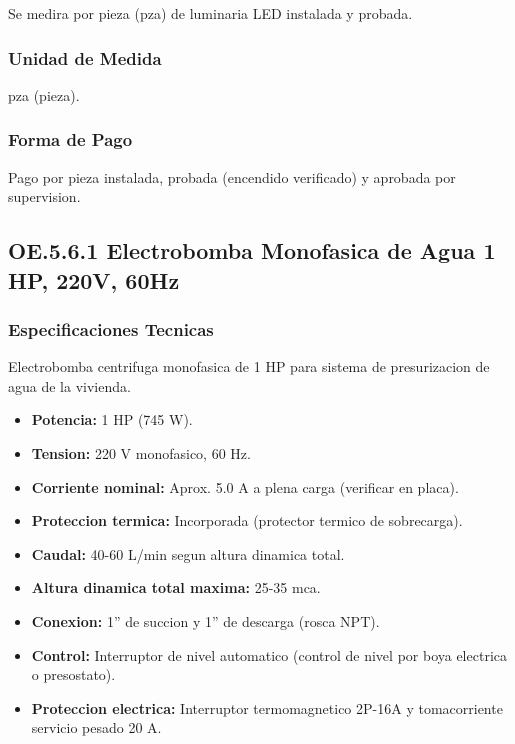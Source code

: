 Se medira por pieza (pza) de luminaria LED instalada y probada.

\subsubsection{Unidad de Medida}

pza (pieza).

\subsubsection{Forma de Pago}

Pago por pieza instalada, probada (encendido verificado) y aprobada por supervision.

\subsection{OE.5.6.1 Electrobomba Monofasica de Agua 1 HP, 220V, 60Hz}

\subsubsection{Especificaciones Tecnicas}

Electrobomba centrifuga monofasica de 1 HP para sistema de presurizacion de agua de la vivienda.

\begin{itemize}[nosep]
  \item \textbf{Potencia:} 1 HP (745 W).
  \item \textbf{Tension:} 220 V monofasico, 60 Hz.
  \item \textbf{Corriente nominal:} Aprox. 5.0 A a plena carga (verificar en placa).
  \item \textbf{Proteccion termica:} Incorporada (protector termico de sobrecarga).
  \item \textbf{Caudal:} 40-60 L/min segun altura dinamica total.
  \item \textbf{Altura dinamica total maxima:} 25-35 mca.
  \item \textbf{Conexion:} 1'' de succion y 1'' de descarga (rosca NPT).
  \item \textbf{Control:} Interruptor de nivel automatico (control de nivel por boya electrica o presostato).
  \item \textbf{Proteccion electrica:} Interruptor termomagnetico 2P-16A y tomacorriente servicio pesado 20 A.
\end{itemize}


